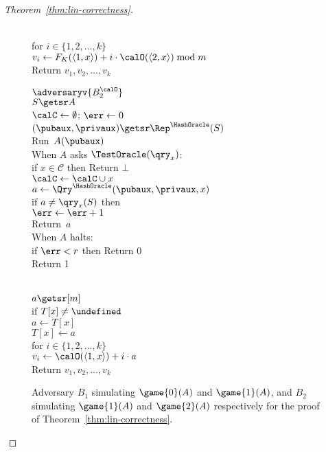 \begin{proof}[Theorem~\ref{thm:lin-correctness}]
\begin{figure}[tp]
{{\medskip
{}\\
for $i \in \{1,2,\ldots,k\}$\\
\nudge $v_i \gets F_{K}(\langle 1,x \rangle) + i \cdot \calO(\langle 2,x \rangle) \bmod m$\\
Return ${v_1,v_2,\ldots,v_k}$
}
{
$\adversaryv{B_2^{\calO}}$\\
$S \getsr A$\\
$\calC \gets \emptyset$; $\err \gets 0$\\
$(\pubaux,\privaux) \getsr \Rep^{\HashOracle}(S)$\\
Run~$A(\pubaux)$\\
When $A$ asks $\TestOracle(\qry_x)$:\\
\nudge if $x \in \mathcal{C}$ then Return $\bot$\\
\nudge $\calC \gets \calC \cup x$\\
\nudge $a \gets \Qry^{\HashOracle}(\pubaux,\privaux, x)$\\
\nudge if $a \neq \qry_x(S)$ then \\
\nudge \nudge $\err \gets \err +1$\\
\nudge Return~$a$\\
When $A$ halts: \\
\nudge if $\err  < r$ then Return 0\\
\nudge Return 1

\medskip
{}\\
$a \getsr [m]$\\
if $T[x] \neq \undefined$\\
\nudge $a \gets T[x]$\\
$T[x] \gets a$\\
for $i \in \{1,2,\ldots,k\}$\\
\nudge $v_i \gets \calO(\langle 1,x \rangle) + i\cdot a$\\
Return ${v_1,v_2,\ldots,v_k}$
}
}
\caption{Adversary $B_1$ simulating $\game{0}(A)$ and $\game{1}(A)$, and $B_2$ simulating $\game{1}(A)$ and $\game{2}(A)$  respectively for the proof of Theorem~\ref{thm:lin-correctness}.}\label{fig:lin-correctness-adv}
\end{figure}


\end{proof}

